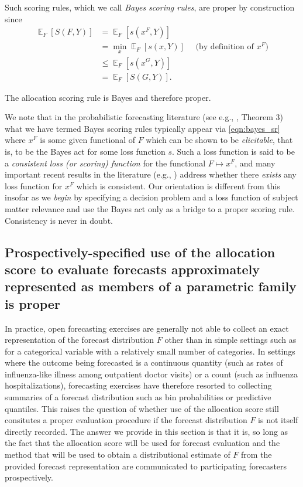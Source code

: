 \documentclass{article}\usepackage[]{graphicx}\usepackage[]{xcolor}
\DeclareMathOperator{\Ex}{\mathbb{E}}
\begin{document}
Such scoring rules, which we call \emph{Bayes scoring rules}, are proper by construction since
\begin{align}
\Ex_F [S(F, Y)] &= \Ex_F [ s(x^F, Y) ] \nonumber \\
 &= \min_{x} \Ex_F [ s(x, Y) ] \quad \text{ (by definition of $x^F$)} \\
 &\leq \Ex_F [ s(x^G, Y) ] \label{eqn:dt_proper_key} \\
 &= \Ex_F [ S(G, Y)]. \nonumber
\end{align}

The allocation scoring rule is Bayes and therefore proper.

We note that in the probabilistic forecasting literature (see e.g., \cite{gneiting2011making}, Theorem 3) what we have 
termed Bayes scoring rules typically appear via \eqref{eqn:bayes_sr} where $x^F$ is some given functional of $F$ which 
can be shown to be \emph{elicitable}, that is, to be the Bayes act for some loss function $s$.
Such a loss function is said to be a \emph{consistent loss (or scoring) function} for the functional $F \mapsto x^F$, and many important
recent results in the literature (e.g., \cite{fisslerziegel2016consistency}) address whether there \emph{exists} any loss 
function for $x^F$ which is consistent. Our orientation
is different from this insofar as we \emph{begin} by specifying a decision problem and a loss function of subject matter relevance
and use the Bayes act only as a bridge to a proper scoring rule.  Consistency is never in doubt.

\subsection{Prospectively-specified use of the allocation score to evaluate forecasts approximately represented as members of a parametric family is proper}
\label{sec:distfromq_alloscore_proper_prospective}

In practice, open forecasting exercises are generally not able to collect an exact representation of the forecast distribution $F$ other than in simple settings such as for a categorical variable with a relatively small number of categories. In settings where the outcome being forecasted is a continuous quantity (such as rates of influenza-like illness among outpatient doctor visits) or a count (such as influenza hospitalizations), forecasting exercises have therefore resorted to collecting summaries of a forecast distribution such as bin probabilities or predictive quantiles. This raises the question of whether use of the allocation score still consitutes a proper evaluation procedure if the forecast distribution $F$ is not itself directly recorded. The answer we provide in this section is that it is, so long as the fact that the allocation score will be used for forecast evaluation and the method that will be used to obtain a distributional estimate of $F$ from the provided forecast representation are communicated to participating forecasters prospectively.
\end{document}
